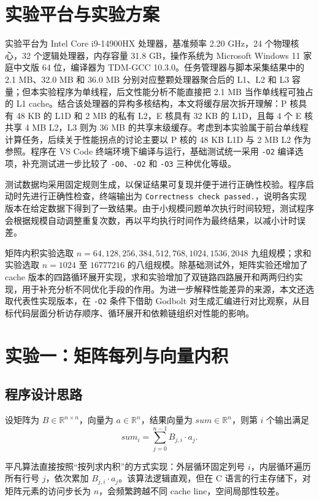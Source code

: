 \documentclass[a4paper,10pt]{article}
\begin{document}
\section{实验平台与实验方案}
实验平台为 Intel Core i9-14900HX 处理器，基准频率 2.20 GHz，24 个物理核心，32 个逻辑处理器，内存容量 31.8 GB，操作系统为 Microsoft Windows 11 家庭中文版 64 位，编译器为 TDM-GCC 10.3.0。任务管理器与脚本采集结果中的 2.1 MB、32.0 MB 和 36.0 MB 分别对应整颗处理器聚合后的 L1、L2 和 L3 容量；但本实验程序为单线程，后文性能分析不能直接把 2.1 MB 当作单线程可独占的 L1 cache。结合该处理器的异构多核结构，本文将缓存层次拆开理解：P 核具有 48 KB 的 L1D 和 2 MB 的私有 L2，E 核具有 32 KB 的 L1D，且每 4 个 E 核共享 4 MB L2，L3 则为 36 MB 的共享末级缓存。考虑到本实验属于前台单线程计算任务，后续关于性能拐点的讨论主要以 P 核的 48 KB L1D 与 2 MB L2 作为参照。程序在 VS Code 终端环境下编译与运行，基础测试统一采用 \texttt{-O2} 编译选项，补充测试进一步比较了 \texttt{-O0}、\texttt{-O2} 和 \texttt{-O3} 三种优化等级。

测试数据均采用固定规则生成，以保证结果可复现并便于进行正确性校验。程序启动时先进行正确性检查，终端输出为 \texttt{Correctness check passed.}，说明各实现版本在给定数据下得到了一致结果。由于小规模问题单次执行时间较短，测试程序会根据规模自动调整重复次数，再以平均执行时间作为最终结果，以减小计时误差。

矩阵内积实验选取 $n=64,128,256,384,512,768,1024,1536,2048$ 九组规模；求和实验选取 $n=1024$ 至 $16777216$ 的八组规模。除基础测试外，矩阵实验还增加了 cache 版本的四路循环展开实现，求和实验增加了双链路四路展开和两两归约实现，用于补充分析不同优化手段的作用。为进一步解释性能差异的来源，本文还选取代表性实现版本，在 \texttt{-O2} 条件下借助 Godbolt 对生成汇编进行对比观察，从目标代码层面分析访存顺序、循环展开和依赖链组织对性能的影响。

\section{实验一：矩阵每列与向量内积}
\subsection{程序设计思路}
设矩阵为 $B\in\mathbb{R}^{n\times n}$，向量为 $a\in\mathbb{R}^{n}$，结果向量为 $sum\in\mathbb{R}^{n}$，则第 $i$ 个输出满足
\[
sum_i=\sum_{j=0}^{n-1}B_{j,i}\cdot a_j.
\]

平凡算法直接按照“按列求内积”的方式实现：外层循环固定列号 $i$，内层循环遍历所有行号 $j$，依次累加 $B_{j,i}\cdot a_j$。该算法逻辑直观，但在 C 语言的行主存储下，对矩阵元素的访问步长为 $n$，会频繁跨越不同 cache line，空间局部性较差。
\end{document}

